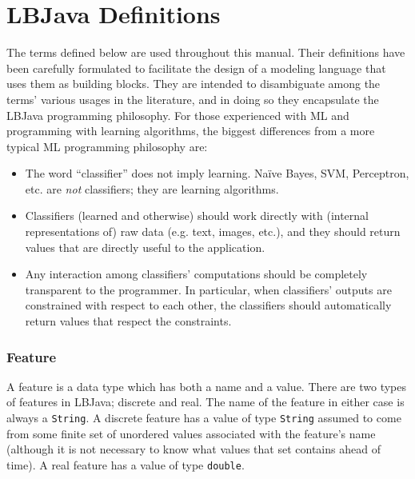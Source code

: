 
\chapter{LBJava Definitions}

The terms defined below are used throughout this manual.  Their definitions
have been carefully formulated to facilitate the design of a modeling language
that uses them as building blocks.  They are intended to disambiguate among
the terms' various usages in the literature, and in doing so they encapsulate
the LBJava programming philosophy.  For those experienced with ML and programming
with learning algorithms, the biggest differences from a more typical ML
programming philosophy are:

\begin{itemize}
\item
The word ``classifier'' does not imply learning.  Na\"ive Bayes, SVM,
Perceptron, etc. are \emph{not} classifiers; they are learning algorithms.

\item
Classifiers (learned and otherwise) should work directly with (internal
representations of) raw data (e.g. text, images, etc.), and they should return
values that are directly useful to the application.

\item
Any interaction among classifiers' computations should be completely
transparent to the programmer.  In particular, when classifiers' outputs are
constrained with respect to each other, the classifiers should automatically
return values that respect the constraints.
\end{itemize}

\subsection*{Feature}
A feature is a data type which has both a name and a value.  There are two
types of features in LBJava; discrete and real.  The name of the feature in
either case is always a {\tt String}.  A discrete feature has a value of type
{\tt String} assumed to come from some finite set of unordered values
associated with the feature's name (although it is not necessary to know what
values that set contains ahead of time).  A real feature has a value of type
{\tt double}.

